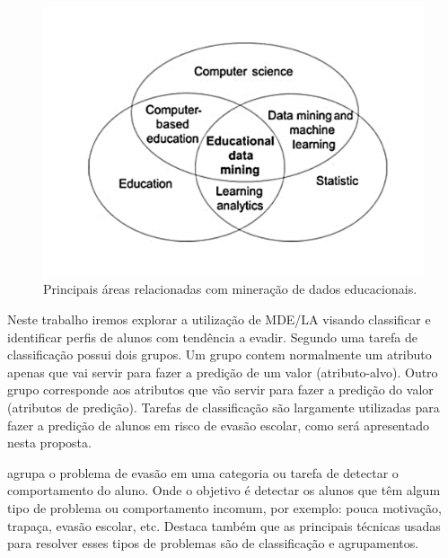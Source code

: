 \documentclass[diss-proposta,nocipinfo]{texufpel}
\begin{document}
\begin{figure}[htbp]
  \centering \includegraphics[scale=.4]{imagens/areas-edm.pdf}
  \caption{Principais áreas relacionadas com mineração de dados educacionais. \cite{Koedinger2008}}
  \label{fig:areas-relacionadas-mde}
\end{figure}


Neste trabalho iremos explorar a utilização de MDE/LA visando classificar e identificar perfis de alunos com tendência a evadir. Segundo \citet{goldschmidt2015data} uma tarefa de classificação possui dois grupos. Um grupo contem normalmente um atributo apenas que vai servir para fazer a predição de um valor (atributo-alvo). Outro grupo corresponde aos atributos que vão servir para fazer a predição do valor (atributos de predição). Tarefas de classificação são largamente utilizadas para fazer a predição de alunos em risco de evasão escolar, como será apresentado nesta proposta.

\citet{baker2010data} agrupa o problema de evasão em uma categoria ou tarefa de detectar o comportamento do aluno. Onde o objetivo é detectar os alunos que têm algum tipo de problema ou comportamento incomum, por exemplo: pouca motivação, trapaça, evasão escolar, etc. Destaca também que as principais técnicas usadas para resolver esses tipos de problemas são de classificação e agrupamentos.
\end{document}
